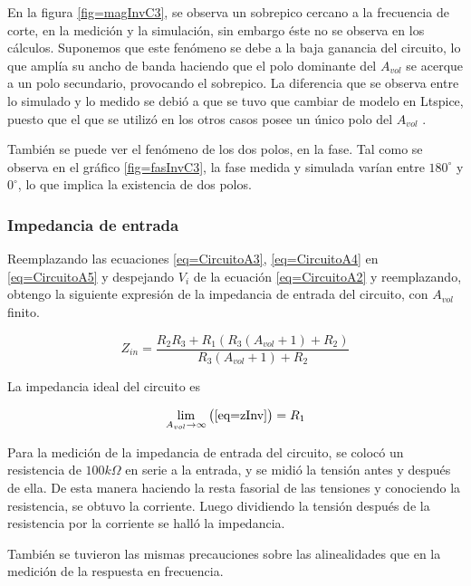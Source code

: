 \documentclass[../../main.tex]{subfiles}
\begin{document}
En la figura \ref{fig=magInvC3}, se observa un sobrepico cercano a la frecuencia de corte, en la medici\'on y la simulaci\'on, sin embargo éste no se observa en los c\'alculos. Suponemos que este fen\'omeno se debe a la baja ganancia del circuito, lo que ampl\'ia su ancho de banda haciendo que el polo dominante del $A_{vol}$ se acerque a un polo secundario, provocando el sobrepico.
La diferencia que se observa entre lo simulado y lo medido se debi\'o a que se tuvo que cambiar de modelo en Ltspice, puesto que el que se utiliz\'o en los otros casos posee un \'unico polo del $A_{vol}$ .\par
Tambi\'en se puede ver el fen\'omeno de los dos polos, en la fase. Tal como se observa en el gr\'afico \ref{fig=fasInvC3}, la fase medida y simulada var\'ian entre  $180^{\circ}$ y $0^{\circ}$, lo que implica la existencia de dos polos.

\subsubsection{Impedancia de entrada}


Reemplazando las ecuaciones \ref{eq=CircuitoA3}, \ref{eq=CircuitoA4} en \ref{eq=CircuitoA5} y despejando $V_{i}$ de la ecuación \ref{eq=CircuitoA2} y reemplazando, obtengo la siguiente expresión de la impedancia de entrada del circuito, con $A_{vol}$ finito.

\begin{equation}
Z_{in}=\frac{R_{2} R_{3}+ R_{1} (R_{3}(A_{vol} +1)+R_{2} )}{R_{3}(A_{vol}+1)+R_{2}}\label{eq=zInv}
\end{equation}

La impedancia ideal del circuito es

$$ \lim_{A_{vol}\to\infty} \big( \ref{eq=zInv} \big) =R_{1} $$

Para la medición de la impedancia de entrada del circuito, se colocó un resistencia de $100k \Omega$ en serie a la entrada, y se midió la tensión antes y después de ella. De esta manera haciendo la resta fasorial de las tensiones y conociendo la resistencia, se obtuvo la corriente. Luego dividiendo la tensión después de la resistencia por la corriente se halló la impedancia.
\par
También se tuvieron las mismas precauciones sobre las alinealidades que en la medición de la respuesta en frecuencia.
\end{document}
